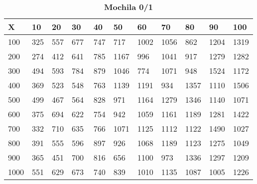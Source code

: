 \documentclass[10pt,letterpaper]{article}
\begin{document}
\newpage 
{}
\begin{center}
\begin{table}\renewcommand{\arraystretch}{2.5}
\caption{\large \textbf{Mochila 0/1}}
\centering
\begin{tabular} { |m{0.5cm}|m{1.3cm}|m{1.3cm}|m{1.3cm}|m{1.3cm}|m{1.3cm}|m{1.3cm}|m{1.3cm}|m{1.3cm}|m{1.3cm}|m{1.3cm}|} 
\hline
\rowcolor{Gray}
\centering \textbf{X} & \centering \textbf{10} & \centering \textbf{20} & \centering \textbf{30}\ & \centering \textbf{40} & \centering \textbf{50} & \centering \textbf{60}\ & \centering \textbf{70} & \centering \textbf{80} & \centering \textbf{90}\ & \textbf{100} \\\hline
\cellcolor{Gray}100 & \Large 325 & \Large 557 & \Large 677 & \Large 747 & \Large 717 & \Large 1002 & \Large 1056 & \Large 862 & \Large 1204 & \Large 1319 \\
\hline
\cellcolor{Gray}200 & \Large 274 & \Large 412 & \Large 641 & \Large 785 & \Large 1167 & \Large 996 & \Large 1041 & \Large 917 & \Large 1279 & \Large 1282 \\
\hline
\cellcolor{Gray}300 & \Large 494 & \Large 593 & \Large 784 & \Large 879 & \Large 1046 & \Large 774 & \Large 1071 & \Large 948 & \Large 1524 & \Large 1172 \\
\hline
\cellcolor{Gray}400 & \Large 369 & \Large 523 & \Large 548 & \Large 763 & \Large 1139 & \Large 1191 & \Large 934 & \Large 1357 & \Large 1110 & \Large 1506 \\
\hline
\cellcolor{Gray}500 & \Large 499 & \Large 467 & \Large 564 & \Large 828 & \Large 971 & \Large 1164 & \Large 1279 & \Large 1346 & \Large 1140 & \Large 1071 \\
\hline
\cellcolor{Gray}600 & \Large 375 & \Large 694 & \Large 622 & \Large 754 & \Large 942 & \Large 1059 & \Large 1161 & \Large 1189 & \Large 1281 & \Large 1422 \\
\hline
\cellcolor{Gray}700 & \Large 332 & \Large 710 & \Large 635 & \Large 766 & \Large 1071 & \Large 1125 & \Large 1112 & \Large 1122 & \Large 1490 & \Large 1027 \\
\hline
\cellcolor{Gray}800 & \Large 391 & \Large 555 & \Large 596 & \Large 897 & \Large 926 & \Large 1068 & \Large 1189 & \Large 1123 & \Large 1275 & \Large 1049 \\
\hline
\cellcolor{Gray}900 & \Large 365 & \Large 451 & \Large 700 & \Large 816 & \Large 656 & \Large 1100 & \Large 973 & \Large 1336 & \Large 1297 & \Large 1209 \\
\hline
\cellcolor{Gray}1000 & \Large 551 & \Large 629 & \Large 673 & \Large 740 & \Large 839 & \Large 1010 & \Large 1135 & \Large 1087 & \Large 1005 & \Large 1226 \\
\hline
\end{tabular} \\
\end{table}
\end{center}
\end{document}
